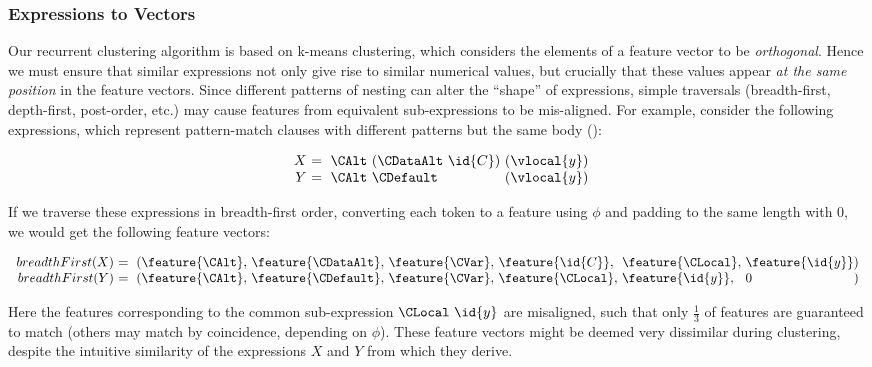 \subsubsection{Expressions to Vectors}
\label{sec:expressionstovectors}

Our recurrent clustering algorithm is based on k-means clustering, which
considers the elements of a feature vector to be \emph{orthogonal}. Hence we
must ensure that similar expressions not only give rise to similar numerical
values, but crucially that these values appear \emph{at the same position} in
the feature vectors. Since different patterns of nesting can alter the ``shape''
of expressions, simple traversals (breadth-first, depth-first, post-order, etc.)
may cause features from equivalent sub-expressions to be mis-aligned. For
example, consider the following expressions, which represent pattern-match
clauses with different patterns but the same body ():

\begin{equation}\label{eq:xy}
  \begin{array}{r@{}l@{}l@{}}
    X\ &=\ \CAlt\ (\CDataAlt\ \id{C})\ & (\vlocal{y}) \\
    Y\ &=\ \CAlt\ \CDefault\           & (\vlocal{y})
  \end{array}
\end{equation}

If we traverse these expressions in breadth-first order, converting each token
to a feature using $\phi$ and padding to the same length with $0$, we would get
the following feature vectors:

\begin{small}
  \begin{equation}
    \begin{array}{r@{}l@{}l@{}l@{}l@{}l@{}l@{}l}
      breadthFirst(X)\ &=\ (\feature{\CAlt},\ &\feature{\CDataAlt},\ &\feature{\CVar},\ &\feature{\id{C}},\ &\feature{\CLocal},\ &\feature{\id{y}} &) \\
      breadthFirst(Y)\ &=\ (\feature{\CAlt},\ &\feature{\CDefault},\ &\feature{\CVar},\ &\feature{\CLocal},\ &\feature{\id{y}},\ &0 &)
    \end{array}
  \end{equation}
\end{small}

Here the features corresponding to the common sub-expression $\CLocal\ \id{y}$
are misaligned, such that only $\frac{1}{3}$ of features are guaranteed to match
(others may match by coincidence, depending on $\phi$). These feature vectors
might be deemed very dissimilar during clustering, despite the intuitive
similarity of the expressions $X$ and $Y$ from which they derive.

